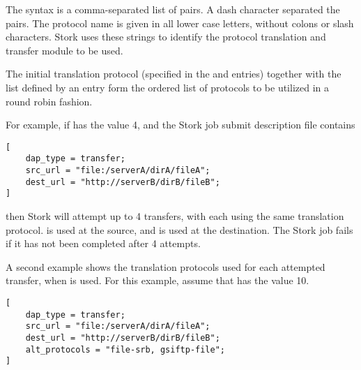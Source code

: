 The syntax is a comma-separated list of pairs.
A dash character separated the pairs.
The protocol name is given in all lower case letters,
without colons or slash characters.
Stork uses these strings to identify the protocol translation
and transfer module to be used. 

The initial translation protocol
(specified in the  and  entries)
together with the list defined by  
an  entry form the ordered list
of protocols to be utilized in a round robin fashion.

For example, if  has the value 4,
and the Stork job submit description file contains
\footnotesize
\begin{verbatim}
[
    dap_type = transfer;
    src_url = "file:/serverA/dirA/fileA";
    dest_url = "http://serverB/dirB/fileB";
]
\end{verbatim}
\normalsize

then Stork will attempt up to 4 transfers,
with each using the same translation protocol.
 is used at the source,
and  is used at the destination.
The Stork job fails if it has not been completed after
4 attempts.

A second example shows the translation protocols used for
each attempted transfer, 
when  is used.
For this example, assume that 
 has the value 10.
\footnotesize
\begin{verbatim}
[
    dap_type = transfer;
    src_url = "file:/serverA/dirA/fileA";
    dest_url = "http://serverB/dirB/fileB";
    alt_protocols = "file-srb, gsiftp-file";
]
\end{verbatim}
\normalsize

